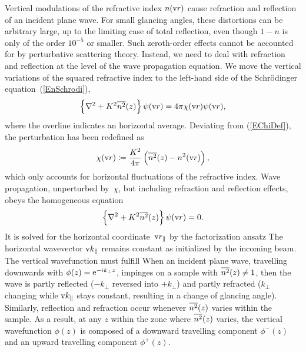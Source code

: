 Vertical modulations of the refractive index $n(\text{v}{r})$
cause refraction and reflection of an incident plane wave.
%
%
%
For small glancing angles,
these distortions can be arbitrary large,
up to the limiting case of total reflection,
even though $1-n$ is only of the order $10^{-5}$ or smaller.
Such zeroth-order effects cannot be accounted for
by perturbative scattering theory.
Instead, we need to deal with refraction and reflection
at the level of the wave propagation equation.
We move the vertical variations of the squared refractive index
to the left-hand side of the Schrödinger equation~(\ref{EnSchrodi}),
\begin{equation}\label{EHelmholtzGraded}
  \left\{\mathbf{\nabla}^2+K^2\overline{n^2}(z)\right\}\psi(\text{v}{r})
  = 4\pi \chi(\text{v}{r}) \psi(\text{v}{r}),
\end{equation}
%
%
where the overline indicates an horizontal average.
Deviating from (\ref{EChiDef}),
the perturbation has been redefined as
\begin{equation}\label{EChiGraded}
  \chi(\text{v}{r}) \coloneqq  \frac{K^2}{4\pi}\left(\overline{n^2}(z)-n^2(\text{v}{r})\right),
\end{equation}
which only accounts for horizontal fluctuations of the refractive index.
Wave propagation,
unperturbed by~$\chi$, but including refraction and reflection effects,
obeys the homogeneous equation
\begin{equation}\label{EHelmholtzGradedHomog}
  \left\{\mathbf{\nabla}^2+K^2\overline{n^2}(z)\right\}\psi(\text{v}{r}) = 0.
\end{equation}
It is solved for the horizontal coordinate~$\text{v}{r}_\parallel$
by the factorization ansatz
%
%
The horizontal wavevector $\text{v}{k}_\parallel$ remains constant
as initialized by the incoming beam.
The vertical wavefunction must fulfill
When an incident plane wave,
travelling downwards with
$\phi(z)=\text{e}^{-ik_\perp z}$,
%
impinges on a sample with $\overline{n^2}(z)\ne 1$,
then the wave is partly reflected ($-k_\perp$ reversed into $+k_\perp$)
and partly refracted
($k_\perp$ changing while $\text{v}{k}_\parallel$ stays constant,
resulting in a change of glancing angle).
Similarly, reflection and refraction occur
whenever $\overline{n^2}(z)$ varies within the sample.
As a result, at any $z$ within the zone where $\overline{n^2}(z)$ varies,
the vertical wavefunction $\phi(z)$ is composed of a
downward travelling component $\phi^-(z)$
and an upward travelling component $\phi^+(z)$.

